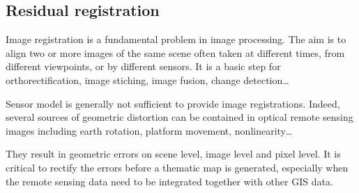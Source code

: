 
\subsection{Residual registration}\label{ssec:registration}

Image registration is a fundamental problem in image processing. The aim is to
align two or more images of the same scene often taken at different times, from
different viewpoints, or by different sensors. It is a basic step for
orthorectification, image stiching, image fusion, change detection\ldots

Sensor model is generally not sufficient to provide image registrations. Indeed,
several sources of geometric distortion can be contained in optical remote
sensing images including earth rotation, platform movement, nonlinearity\ldots

They result in geometric errors on scene level, image level and pixel level. It
is critical to rectify the errors before a thematic map is generated, especially
when the remote sensing data need to be integrated together with other GIS data.

